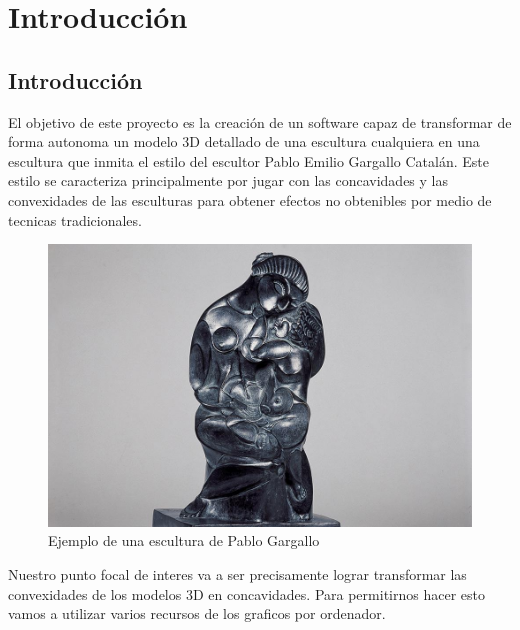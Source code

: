 \chapter{Introducción}

\section{Introducción}
El objetivo de este proyecto es la creación de un software capaz de transformar de forma autonoma un modelo 3D detallado de una escultura cualquiera en una escultura que inmita el estilo del escultor Pablo Emilio Gargallo Catalán.
Este estilo se caracteriza principalmente por jugar con las concavidades y las convexidades de las esculturas para obtener efectos no obtenibles por medio de tecnicas tradicionales.

\begin{figure}
    \centering
    \includegraphics[width=\textwidth]{imagenes/maternidad_gargallo.jpg}
    \caption{Ejemplo de una escultura de Pablo Gargallo}
\end{figure}


Nuestro punto focal de interes va a ser precisamente lograr transformar las convexidades de los modelos 3D en concavidades. Para permitirnos hacer esto vamos a utilizar varios recursos de los graficos por ordenador.

